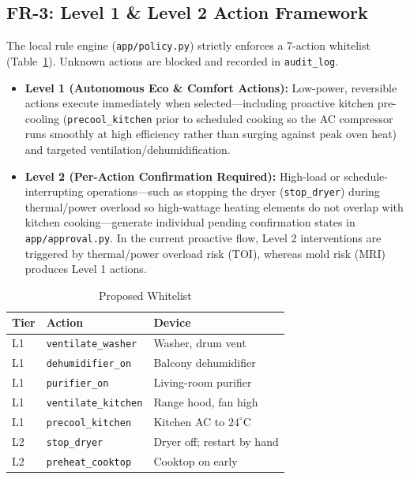 \documentclass[conference]{IEEEtran}
\begin{document}
\subsection{FR-3: Level 1 \& Level 2 Action Framework}
The local rule engine (\texttt{app/policy.py}) strictly enforces a 7-action whitelist (Table~\ref{tab:whitelist}). Unknown actions are blocked and recorded in \texttt{audit\_log}.
\begin{itemize}
    \item \textbf{Level 1 (Autonomous Eco \& Comfort Actions):} Low-power, reversible actions execute immediately when selected---including proactive kitchen pre-cooling (\texttt{precool\_kitchen} prior to scheduled cooking so the AC compressor runs smoothly at high efficiency rather than surging against peak oven heat) and targeted ventilation/dehumidification.
    \item \textbf{Level 2 (Per-Action Confirmation Required):} High-load or schedule-interrupting operations---such as stopping the dryer (\texttt{stop\_dryer}) during thermal/power overload so high-wattage heating elements do not overlap with kitchen cooking---generate individual pending confirmation states in \texttt{app/approval.py}. In the current proactive flow, Level 2 interventions are triggered by thermal/power overload risk (TOI), whereas mold risk (MRI) produces Level 1 actions.
\end{itemize}

\begin{table}[htbp]
\caption{Proposed Whitelist}
\label{tab:whitelist}
\begin{center}
\begin{tabular}{lll}
\toprule
\textbf{Tier} & \textbf{Action} & \textbf{Device} \\
\midrule
L1 & \texttt{ventilate\_washer} & Washer, drum vent \\
L1 & \texttt{dehumidifier\_on} & Balcony dehumidifier \\
L1 & \texttt{purifier\_on} & Living-room purifier \\
L1 & \texttt{ventilate\_kitchen} & Range hood, fan high \\
L1 & \texttt{precool\_kitchen} & Kitchen AC to $24^\circ\text{C}$ \\
L2 & \texttt{stop\_dryer} & Dryer off; restart by hand \\
L2 & \texttt{preheat\_cooktop} & Cooktop on early \\
\bottomrule
\end{tabular}
\end{center}
\end{table}
\end{document}
